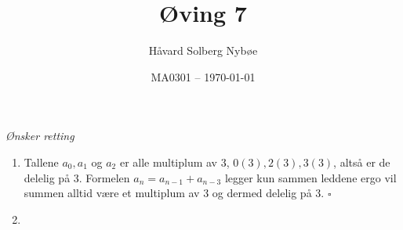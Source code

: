 \documentclass[a4paper, 12pt]{article}  %
\title{Øving 7}                         %
\author{Håvard Solberg Nybøe}           %
\date{MA0301 -- \today}                 %
\begin{document}
\maketitle
\textit{Ønsker retting}

\begin{enumerate}
    \item [\boxed{1}]
        Tallene \(a_0, a_1\) og \(a_2\) er alle multiplum av 3, \(0(3), 2(3), 3(3)\), altså er de delelig på 3.
        Formelen \(a_n = a_{n-1} + a_{n-3}\) legger kun sammen leddene ergo vil summen alltid være et multiplum av 3 og dermed delelig på 3. \(\square\)
    \item [\boxed{2}]
    \
\end{enumerate}

\end{document}
